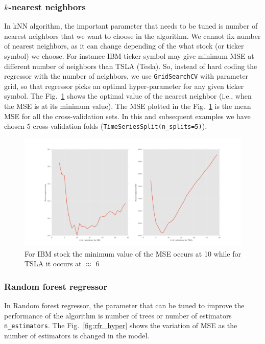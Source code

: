 \documentclass[12pt]{article}
\begin{document}
\begin{itemize}
\subsubsection{$k$-nearest neighbors}
In kNN algorithm, the important parameter that needs to be tuned is number of nearest neighbors that we want to choose in the algorithm. We cannot fix number of nearest neighbors, as it can change depending of the what stock (or ticker symbol) we choose. For instance IBM ticker symbol may give minimum MSE at different number of neighbors than TSLA (Tesla). So, instead of hard coding the regressor with the number of neighbors, we use \texttt{GridSearchCV} with parameter grid, so that regressor picks an optimal hyper-parameter for any given ticker symbol. The Fig.~\ref{fig:knn_hyper} shows the optimal value of the nearest neighbor (i.e., when the MSE is at its minimum value). The MSE plotted in the Fig.~\ref{fig:knn_hyper} is the mean MSE for all the cross-validation sets. In this and subsequent examples we have chosen 5 cross-validation folds (\texttt{TimeSeriesSplit(n\_splits=5)}).

\begin{figure}[!htbp]
\begin{center}
\includegraphics[height=0.4\textheight,width=\textwidth]{knn_mse_neighbors_IBM_TSLA.png}
\caption{For IBM stock the minimum value of the MSE occurs at 10 while for TSLA it occurs at $\approx$ 6}
\label{fig:knn_hyper}
\end{center}
\end{figure}

\subsubsection{Random forest regressor}
\label{sec:hyper_rfr}
In Random forest regressor, the parameter that can be tuned to improve the performance of the algorithm is number of trees or number of estimators \texttt{n\_estimators}. The Fig.~\ref{fig:rfr_hyper} shows the variation of MSE as the number of estimators is changed in the model.


\end{itemize}
\end{document}
